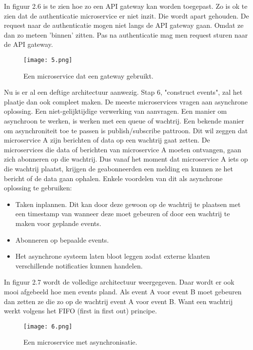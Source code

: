 In figuur 2.6 is te zien hoe zo een API gateway kan worden toegepast. Zo is ok te zien dat de authenticatie microservice er niet inzit. Die wordt apart gehouden. De request naar de authenticatie mogen niet langs de API gateway gaan. Omdat ze dan zo meteen 'binnen' zitten. Pas na authenticatie mag men request sturen naar de API gateway.
\begin{figure}[h]
	\texttt{[image: 5.png]}
	\caption{Een microservice dat een gateway gebruikt. \textcite{Benetis2016}}
	\centering
\end{figure}

Nu is er al een deftige architectuur aanwezig. Stap 6, "construct events", zal het plaatje dan ook compleet maken. De meeste microservices vragen aan asynchrone oplossing. Een niet-gelijktijdige verwerking van aanvragen. Een manier om asynchroon te werken, is werken met een queue of wachtrij. Een bekende manier om asynchroniteit toe te passen is publish/subscribe pattroon. Dit wil zeggen dat microservice A zijn berichten of data op een wachtrij gaat zetten. De microservices die data of berichten van microservice A moeten ontvangen, gaan zich abonneren op die wachtrij. Dus vanaf het moment dat microservice A iets op die wachtrij plaatst, krijgen de geabonneerden een melding en kunnen ze het bericht of de data gaan ophalen. Enkele voordelen van dit als asynchrone oplossing te gebruiken:
\begin{itemize}
	\item Taken inplannen. Dit kan door deze gewoon op de wachtrij te plaatsen met een timestamp van wanneer deze moet gebeuren of door een wachtrij te maken voor geplande events.
	\item Abonneren op bepaalde events.
	\item Het asynchrone systeem laten bloot leggen zodat externe klanten verschillende notificaties kunnen handelen.
\end{itemize}
In figuur 2.7 wordt de volledige architectuur weergegeven. Daar wordt er ook mooi afgebeeld hoe men events pland. Als event A voor event B moet gebeuren dan zetten ze die zo op de wachtrij event A voor event B. Want een wachtrij werkt volgens het FIFO (first in first out) principe.
\begin{figure}[h]
	\texttt{[image: 6.png]}
	\caption{Een microservice met asynchronisatie. \textcite{Benetis2016}}
	\centering
\end{figure}

